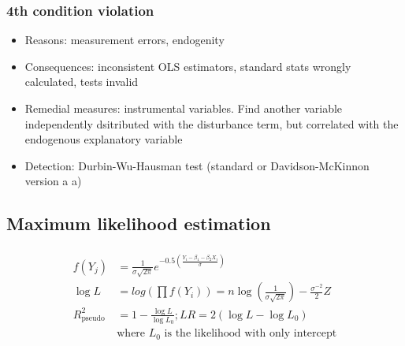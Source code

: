 \documentclass{article}
\def\Eq#1{{\begin{gather}\begin{split} #1 \end{split}\end{gather}}}
\begin{document}
\begin{multicols}{2}
\subsubsection*{ 4th condition violation }
\begin{itemize}
\item Reasons: measurement errors, endogenity
\item Consequences: inconsistent OLS estimators, standard stats wrongly calculated, tests invalid
\item Remedial measures: instrumental variables. Find another variable independently dsitributed with the disturbance term, but correlated with the endogenous explanatory variable
\item Detection: Durbin-Wu-Hausman test (standard or Davidson-McKinnon version a a)
\end{itemize}
\end{multicols}

\begin{multicols}{2}
\subsection*{Maximum likelihood estimation}
\Eq{
    f(Y_j) &= \frac{1}{\sigma\sqrt{2 \pi}}e^{-0.5\left(\frac{Y_i - \beta_1 - \beta_2 X_i}{\sigma}\right)} \\
    \log L &= log\left(\prod f(Y_i)\right) = n \log\left(\frac{1}{\sigma \sqrt{2\pi}}\right) - \frac{\sigma^{-2}}{2} Z \\
    R^2_{\text{pseudo}} &= 1 - \frac{\log L}{\log L_0}; LR = 2(\log L - \log L_0) \\
    &\text{where $L_0$ is the likelihood with only intercept} \\
}
\end{multicols}
\end{document}
